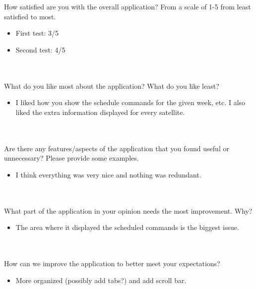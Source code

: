 \documentclass[12pt, titlepage]{article}
\begin{document}
\\ \\

How satisfied are you with the overall application? From a scale of 1-5 from least satisfied to most.

\begin{itemize}
    \item First test: 3/5
    \item Second test: 4/5
\end{itemize}

\\ \\

What do you like most about the application? What do you like least?

\begin{itemize}
    \item I liked how you show the schedule commands for the given week, etc. I also liked the extra information displayed for every satellite.
\end{itemize}

\\ \\

Are there any features/aspects of the application that you found useful or unnecessary? Please provide some examples. 

\begin{itemize}
    \item I think everything was very nice and nothing was redundant.
\end{itemize}

\\ \\

What part of the application in your opinion needs the most improvement. Why?

\begin{itemize}
    \item The area where it displayed the scheduled commands is the biggest issue.
\end{itemize}

\\ \\

How can we improve the application to better meet your expectations? 

\begin{itemize}
    \item More organized (possibly add tabs?) and add scroll bar.
\end{itemize}
\end{document}
